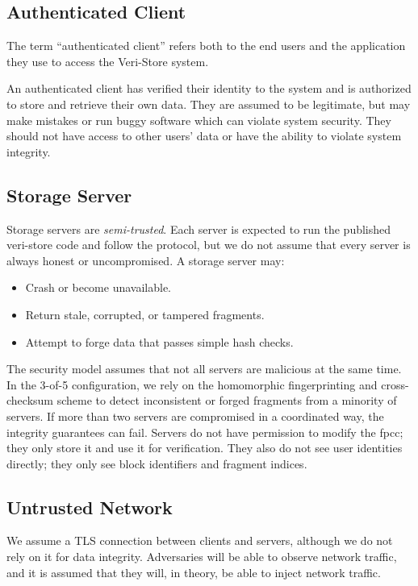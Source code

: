 \documentclass[../veristore_security_model.tex]{subfiles}
\begin{document}
\subsection{Authenticated Client}
The term ``authenticated client'' refers both to the end users and the application they use to access the Veri-Store system.

An authenticated client has verified their identity to the system and is authorized to store and retrieve their own data. They are assumed to be legitimate, but may make mistakes or run buggy software which can violate system security. They should not have access to other users' data or have the ability to violate system integrity.

\subsection{Storage Server}

Storage servers are \emph{semi-trusted}. Each server is expected to run the published veri-store code and follow the protocol, but we do not assume that every server is always honest or uncompromised.
A storage server may:
\begin{itemize}
    \item Crash or become unavailable.
    \item Return stale, corrupted, or tampered fragments.
    \item Attempt to forge data that passes simple hash checks.
\end{itemize}
The security model assumes that not all servers are malicious at the same time. In the 3-of-5 configuration, we rely on the homomorphic fingerprinting and cross-checksum scheme to detect inconsistent or forged fragments from a minority of servers. If more than two servers are compromised in a coordinated way, the integrity guarantees can fail.
Servers do not have permission to modify the fpcc; they only store it and use it for verification. They also do not see user identities directly; they only see block identifiers and fragment indices.


\subsection{Untrusted Network}
We assume a TLS connection between clients and servers, although we do not rely on it for data integrity. Adversaries will be able to observe network traffic, and it is assumed that they will, in theory, be able to inject network traffic. 
\end{document}
